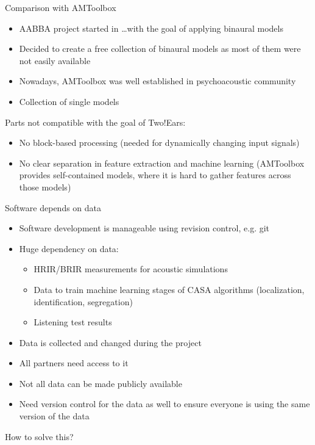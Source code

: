 \documentclass{beamer}
\begin{document}
\begin{frame}{Comparison with AMToolbox}

    \begin{itemize}
        \item AABBA project started in \dots with the goal of applying binaural
            models
        \item Decided to create a free collection of binaural models as most of
            them were not easily available
        \item Nowadays, AMToolbox was well established in psychoacoustic community
        \item Collection of single models
    \end{itemize}

    Parts not compatible with the goal of Two!Ears:
    \begin{itemize}
        \item No block-based processing (needed for dynamically changing input
            signals)
        \item No clear separation in feature extraction and machine learning
            (AMToolbox provides self-contained models, where it is hard to
            gather features across those models)
    \end{itemize}

\end{frame}

\begin{frame}{Software depends on data}

    \begin{itemize}
        \item Software development is manageable using revision control, e.g. git
        \item Huge dependency on data:
            \begin{itemize}
                \item HRIR/BRIR measurements for acoustic simulations
                \item Data to train machine learning stages of CASA algorithms
                    (localization, identification, segregation)
                \item Listening test results
            \end{itemize}
        \item Data is collected and changed during the project
        \item All partners need access to it
        \item Not all data can be made publicly available
        \item Need version control for the data as well to ensure everyone is
            using the same version of the data
    \end{itemize}

    How to solve this?

\end{frame}
\end{document}
